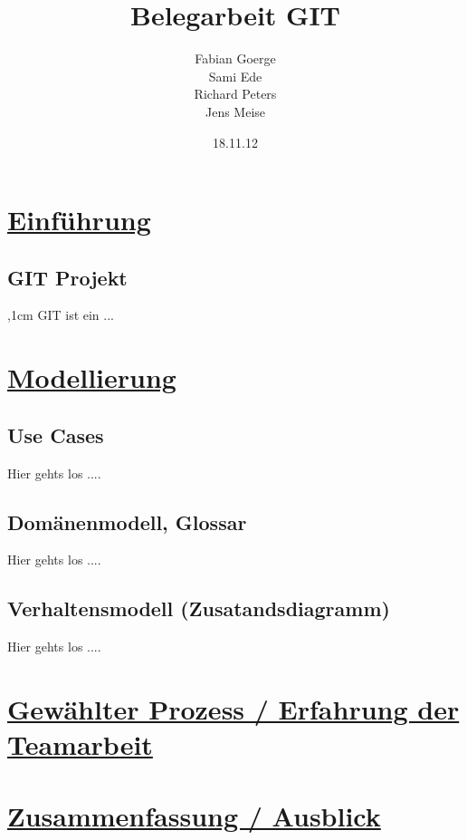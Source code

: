 \documentclass[a4paper]{article}
\begin{document}
\title{\textbf{{\Huge Belegarbeit GIT}}}
\author{Fabian Goerge \\  Sami Ede \\ Richard Peters \\ Jens Meise}
\date{18.11.12}
\maketitle
\newpage
\tableofcontents
\newpage
\section{\underline{Einführung}}
\subsection{GIT Projekt}

\par
\begingroup
{},1cm 
\noindent GIT ist ein ...
\par
\endgroup


	
\section{\underline{Modellierung}}

\subsection{Use Cases}

	Hier gehts los ....
		
\subsection{Domänenmodell, Glossar}

	Hier gehts los ....
	
\subsection{Verhaltensmodell (Zusatandsdiagramm)}

	Hier gehts los ....
	
\section{\underline{Gewählter Prozess / Erfahrung der Teamarbeit}}

\section{\underline{Zusammenfassung / Ausblick}}
\end{document}
